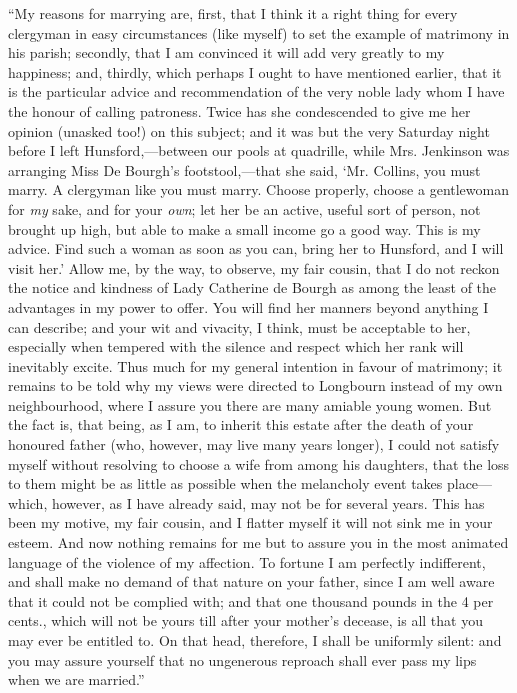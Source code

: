 ``My reasons for marrying are, first, that I think it a right thing for every clergyman in easy circumstances (like myself) to set the example of matrimony in his parish; secondly, that I am convinced it will add very greatly to my happiness; and, thirdly, which perhaps I ought to have mentioned earlier, that it is the particular advice and recommendation of the very noble lady whom I have the honour of calling patroness. Twice has she condescended to give me her opinion (unasked too!) on this subject; and it was but the very Saturday night before I left Hunsford,---between our pools at quadrille, while Mrs. Jenkinson was arranging Miss De Bourgh's footstool,---that she said, `Mr. Collins, you must marry. A clergyman like you must marry. Choose properly, choose a gentlewoman for \textit{my} sake, and for your \textit{own}; let her be an active, useful sort of person, not brought up high, but able to make a small income go a good way. This is my advice. Find such a woman as soon as you can, bring her to Hunsford, and I will visit her.' Allow me, by the way, to observe, my fair cousin, that I do not reckon the notice and kindness of Lady Catherine de Bourgh as among the least of the advantages in my power to offer. You will find her manners beyond anything I can describe; and your wit and vivacity, I think, must be acceptable to her, especially when tempered with the silence and respect which her rank will inevitably excite. Thus much for my general intention in favour of matrimony; it remains to be told why my views were directed to Longbourn instead of my own neighbourhood, where I assure you there are many amiable young women. But the fact is, that being, as I am, to inherit this estate after the death of your honoured father (who, however, may live many years longer), I could not satisfy myself without resolving to choose a wife from among his daughters, that the loss to them might be as little as possible when the melancholy event takes place---which, however, as I have already said, may not be for several years. This has been my motive, my fair cousin, and I flatter myself it will not sink me in your esteem. And now nothing remains for me but to assure you in the most animated language of the violence of my affection. To fortune I am perfectly indifferent, and shall make no demand of that nature on your father, since I am well aware that it could not be complied with; and that one thousand pounds in the 4 per cents., which will not be yours till after your mother's decease, is all that you may ever be entitled to. On that head, therefore, I shall be uniformly silent: and you may assure yourself that no ungenerous reproach shall ever pass my lips when we are married.''

